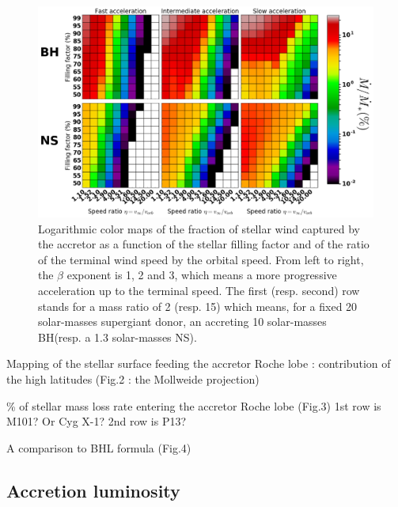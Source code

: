 \documentclass[letter]{aa}
\makeatletter
\newcommand*{\ns}{NS\@\xspace}
\newcommand*{\bh}{BH\@\xspace}
\makeatother
\begin{document}
\begin{figure}[!b]
\centering
\includegraphics[width=2\columnwidth]{Pictures/mdot_grid.png}
\caption{Logarithmic color maps of the fraction of stellar wind captured by the accretor as a function of the stellar filling factor and of the ratio of the terminal wind speed by the orbital speed. From left to right, the $\beta$ exponent is 1, 2 and 3, which means a more progressive acceleration up to the terminal speed. The first (resp. second) row stands for a mass ratio of 2 (resp. 15) which means, for a fixed 20 solar-masses supergiant donor, an accreting 10 solar-masses \bh (resp. a 1.3 solar-masses \ns).}
\label{fig:mdot}
\end{figure} 

Mapping of the stellar surface feeding the accretor Roche lobe : contribution of the high latitudes (Fig.2 : the Mollweide projection)

\% of stellar mass loss rate entering the accretor Roche lobe (Fig.3)
1st row is M101? Or Cyg X-1?
2nd row is P13?

A comparison to BHL formula (Fig.4)

\subsection{Accretion luminosity}
\label{sec:}
\end{document}
